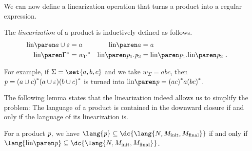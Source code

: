 \documentclass[../../diss.tex]{subfiles}
\begin{document}
We can now define a linearization operation that turns a product into a regular expression.
%
\begin{definition}%
\label{Definition:Linearization}%
    The \emph{linearization} of a product is inductively defined as follows.
    \begin{align*}
        \linof{a \cup \varepsilon} &=a
        &\linof{a}&=a\\
        \linof{\Gamma^*}&={w_\Gamma}^*
        &\linof{\product_1.\product_2} &= \linof{\product_1}.\linof{\product_2}\ .
    \end{align*}
\end{definition}

\begin{example}%
\label{Example:PNLinearization}%
    For example, if $\Sigma=\set{a, b, c}$ and we take $w_{\Sigma}=abc$, then $\mathit{p}={(a\cup c)}^*(a\cup\varepsilon){(b\cup c)}^*$ is turned into $\linof{\product}={(ac)}^*a{(bc)}^*$.
\end{example}

The following lemma states that the linearization indeed allows us to simplify the problem:
The language of a product is contained in the downward closure if and only if the language of its linearization is.

\begin{lemma}%
\label{Lemma:Linearization}%
    For a product $\mathit{p}$, we have
    $\lang{\product} \subseteq \dc{\lang{N, \Minit, \Mfinal}}$
    if and only if
    $\lang{\linof{\product}}\subseteq \dc{\lang{N, \Minit, \Mfinal}}$.
\end{lemma}
\end{document}
